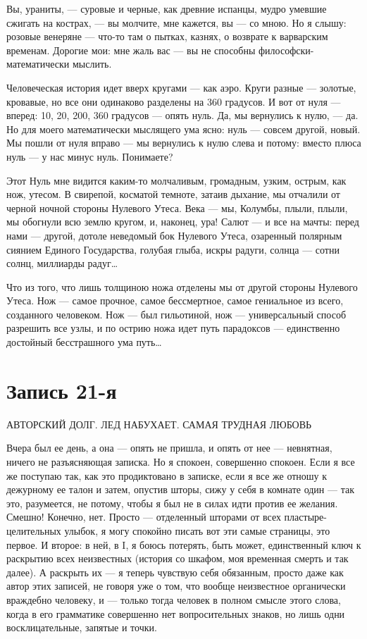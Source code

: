 \documentclass[11pt,openany]{book}
\newcommand{\bookchapterplain}[1]{%
  \clearpage\phantomsection\chapter*{#1}%
  \addcontentsline{toc}{chapter}{#1}\markboth{#1}{#1}\thispagestyle{plain}}
\begin{document}
Вы, ураниты, --- суровые и черные, как древние испанцы, мудро умевшие сжигать на кострах, --- вы молчите, мне кажется, вы --- со мною. Но я слышу: розовые венеряне --- что-то там о пытках, казнях, о возврате к варварским временам. Дорогие мои: мне жаль вас --- вы не способны философски-математически мыслить.

Человеческая история идет вверх кругами --- как аэро. Круги разные --- золотые, кровавые, но все они одинаково разделены на 360 градусов. И вот от нуля --- вперед: 10, 20, 200, 360 градусов --- опять нуль. Да, мы вернулись к нулю, --- да. Но для моего математически мыслящего ума ясно: нуль --- совсем другой, новый. Мы пошли от нуля вправо --- мы вернулись к нулю слева и потому: вместо плюса нуль --- у нас минус нуль. Понимаете?

Этот Нуль мне видится каким-то молчаливым, громадным, узким, острым, как нож, утесом. В свирепой, косматой темноте, затаив дыхание, мы отчалили от черной ночной стороны Нулевого Утеса. Века --- мы, Колумбы, плыли, плыли, мы обогнули всю землю кругом, и, наконец, ура! Салют --- и все на мачты: перед нами --- другой, дотоле неведомый бок Нулевого Утеса, озаренный полярным сиянием Единого Государства, голубая глыба, искры радуги, солнца --- сотни солнц, миллиарды радуг\ldots{}

Что из того, что лишь толщиною ножа отделены мы от другой стороны Нулевого Утеса. Нож --- самое прочное, самое бессмертное, самое гениальное из всего, созданного человеком. Нож --- был гильотиной, нож --- универсальный способ разрешить все узлы, и по острию ножа идет путь парадоксов --- единственно достойный бесстрашного ума путь\ldots{}

\bookchapterplain{Запись 21-я}

\begin{center}\textsc{АВТОРСКИЙ ДОЛГ. ЛЕД НАБУХАЕТ. САМАЯ ТРУДНАЯ ЛЮБОВЬ}\end{center}

Вчера был ее день, а она --- опять не пришла, и опять от нее --- невнятная, ничего не разъясняющая записка. Но я спокоен, совершенно спокоен. Если я все же поступаю так, как это продиктовано в записке, если я все же отношу к дежурному ее талон и затем, опустив шторы, сижу у себя в комнате один --- так это, разумеется, не потому, чтобы я был не в силах идти против ее желания. Смешно! Конечно, нет. Просто --- отделенный шторами от всех пластыре-целительных улыбок, я могу спокойно писать вот эти самые страницы, это первое. И второе: в ней, в I, я боюсь потерять, быть может, единственный ключ к раскрытию всех неизвестных (история со шкафом, моя временная смерть и так далее). А раскрыть их --- я теперь чувствую себя обязанным, просто даже как автор этих записей, не говоря уже о том, что вообще неизвестное органически враждебно человеку, и  --- только тогда человек в полном смысле этого слова, когда в его грамматике совершенно нет вопросительных знаков, но лишь одни восклицательные, запятые и точки.
\end{document}

